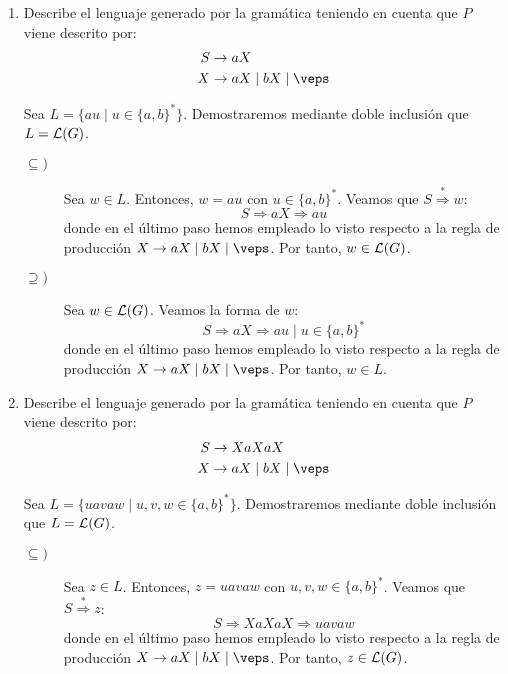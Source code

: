 \begin{ejercicio}
\begin{enumerate}
        \item Describe el lenguaje generado por la gramática teniendo en cuenta que $P$ viene descrito por:
        \begin{align*}
            S &\rightarrow aX \\
            X &\rightarrow aX \mid bX \mid \veps
        \end{align*}

        Sea $L=\{au \mid u\in\{a,b\}^\ast\}$. Demostraremos mediante doble inclusión que $L=\mathcal{L}(G)$.
        \begin{description}
            \item[$\subseteq)$] Sea $w\in L$. Entonces, $w=au$ con $u\in\{a,b\}^\ast$. Veamos que
            $S \stackrel{\ast}{\Longrightarrow} w$:
            \begin{equation*}
                S \Longrightarrow aX \Longrightarrow au
            \end{equation*}
            donde en el último paso hemos empleado lo visto respecto a la regla de producción $X\rightarrow aX \mid bX \mid \veps$. Por tanto, $w\in \mathcal{L}(G)$.

            \item[$\supseteq)$] Sea $w\in\mathcal{L}(G)$. Veamos la forma de $w$:
            \begin{equation*}
                S \Longrightarrow aX \Longrightarrow au \mid u\in\{a,b\}^\ast
            \end{equation*}
            donde en el último paso hemos empleado lo visto respecto a la regla de producción $X\rightarrow aX \mid bX \mid \veps$. Por tanto, $w\in L$.
        \end{description}

        \item Describe el lenguaje generado por la gramática teniendo en cuenta que $P$ viene descrito por:
        \begin{align*}
            S &\rightarrow XaXaX \\
            X &\rightarrow aX \mid bX \mid \veps
        \end{align*}

        Sea $L=\{uavaw \mid u,v,w\in\{a,b\}^\ast\}$. Demostraremos mediante doble inclusión que $L=\mathcal{L}(G)$.
        \begin{description}
            \item[$\subseteq)$] Sea $z\in L$. Entonces, $z=uavaw$ con $u,v,w\in\{a,b\}^\ast$. Veamos que
            $S \stackrel{\ast}{\Longrightarrow} z$:
            \begin{equation*}
                S \Longrightarrow XaXaX \Longrightarrow uavaw
            \end{equation*}
            donde en el último paso hemos empleado lo visto respecto a la regla de producción $X\rightarrow aX \mid bX \mid \veps$. Por tanto, $z\in \mathcal{L}(G)$.


\end{description}
\end{enumerate}
\end{ejercicio}
